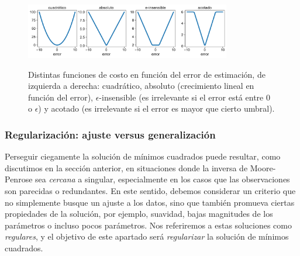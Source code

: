 \begin{figure}[H]
	\centering
	\includegraphics[width=0.8\textwidth]{img/cap2_errores.pdf}\\
	\caption{Distintas funciones de costo en función del error de estimación, de izquierda a derecha: cuadrático, absoluto (crecimiento lineal en función del error), $\epsilon$-insensible (es irrelevante si el error está entre 0 o  $\epsilon$) y acotado (es irrelevante si el error es mayor que cierto umbral).}
	\label{fig:reg_lin_err}  
\end{figure}


\subsubsection{Regularización: ajuste versus generalización}
\label{sub:min_cuad_reg}

Perseguir ciegamente la solución de mínimos cuadrados puede resultar, como discutimos en la sección anterior, en situaciones donde la inversa de Moore-Penrose sea \emph{cercana} a singular, especialmente en los casos que las observaciones son parecidas o redundantes. En este sentido, debemos considerar un criterio que no simplemente busque un ajuste a los datos, sino que también promueva ciertas propiedades de la solución, por ejemplo, suavidad, bajas magnitudes de los parámetros o incluso pocos parámetros. Nos referiremos a estas soluciones como \emph{regulares}, y el objetivo de este apartado será \emph{regularizar} la solución de mínimos cuadrados.\\

